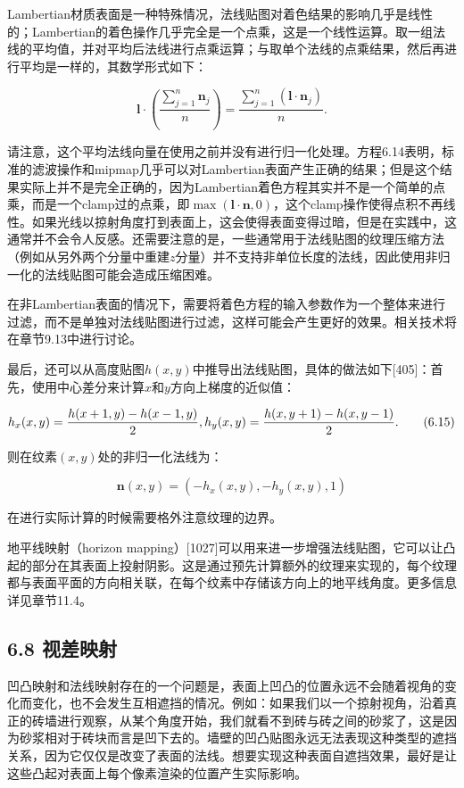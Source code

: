 \documentclass[
  paper=a4,
  ,captions=tableheading
]{scrartcl}
\begin{document}
Lambertian材质表面是一种特殊情况，法线贴图对着色结果的影响几乎是线性的；Lambertian的着色操作几乎完全是一个点乘，这是一个线性运算。取一组法线的平均值，并对平均后法线进行点乘运算；与取单个法线的点乘结果，然后再进行平均是一样的，其数学形式如下：

\[
  \mathbf{l} \cdot\left(\frac{\sum_{j=1}^{n} \mathbf{n}_{j}}{n}\right)=\frac{\sum_{j=1}^{n}\left(\mathbf{l} \cdot \mathbf{n}_{j}\right)}{n}.
  \tag{6.14}
\]

请注意，这个平均法线向量在使用之前并没有进行归一化处理。方程6.14表明，标准的滤波操作和mipmap几乎可以对Lambertian表面产生正确的结果；但是这个结果实际上并不是完全正确的，因为Lambertian着色方程其实并不是一个简单的点乘，而是一个clamp过的点乘，即\(\max (\mathbf{l} \cdot \mathbf{n}, 0)\)，这个clamp操作使得点积不再线性。如果光线以掠射角度打到表面上，这会使得表面变得过暗，但是在实践中，这通常并不会令人反感。还需要注意的是，一些通常用于法线贴图的纹理压缩方法（例如从另外两个分量中重建\(z\)分量）并不支持非单位长度的法线，因此使用非归一化的法线贴图可能会造成压缩困难。

在非Lambertian表面的情况下，需要将着色方程的输入参数作为一个整体来进行过滤，而不是单独对法线贴图进行过滤，这样可能会产生更好的效果。相关技术将在章节9.13中进行讨论。

最后，还可以从高度贴图\(h(x, y)\)中推导出法线贴图，具体的做法如下{[}405{]}：首先，使用中心差分来计算\(x\)和\(y\)方向上梯度的近似值：

\[
  h_{x}(x, y)=\frac{h(x+1, y)-h(x-1, y)}{2}, \\[2mm]
  h_{y}(x, y)=\frac{h(x, y+1)-h(x, y-1)}{2}.
  \tag{6.15}
\]

则在纹素\((x, y)\)处的非归一化法线为：

\[
  \mathbf{n}(x, y)=\left(-h_{x}(x, y),-h_{y}(x, y), 1\right)
  \tag{6.16}
\]

在进行实际计算的时候需要格外注意纹理的边界。

地平线映射（horizon
mapping）{[}1027{]}可以用来进一步增强法线贴图，它可以让凸起的部分在其表面上投射阴影。这是通过预先计算额外的纹理来实现的，每个纹理都与表面平面的方向相关联，在每个纹素中存储该方向上的地平线角度。更多信息详见章节11.4。

\subsection{6.8 视差映射}\label{ux89c6ux5deeux6620ux5c04}

凹凸映射和法线映射存在的一个问题是，表面上凹凸的位置永远不会随着视角的变化而变化，也不会发生互相遮挡的情况。例如：如果我们以一个掠射视角，沿着真正的砖墙进行观察，从某个角度开始，我们就看不到砖与砖之间的砂浆了，这是因为砂浆相对于砖块而言是凹下去的。墙壁的凹凸贴图永远无法表现这种类型的遮挡关系，因为它仅仅是改变了表面的法线。想要实现这种表面自遮挡效果，最好是让这些凸起对表面上每个像素渲染的位置产生实际影响。
\end{document}
